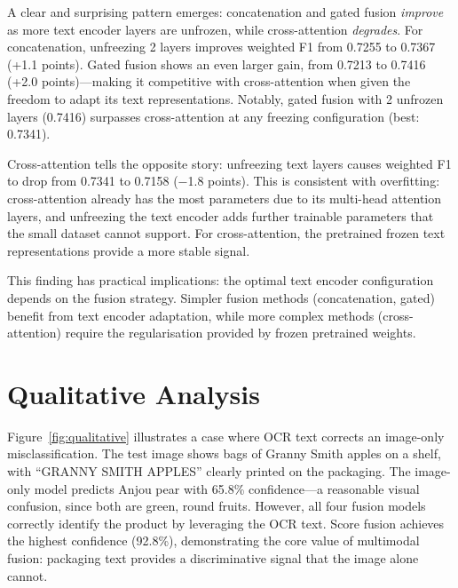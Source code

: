 \documentclass[10pt,twocolumn]{article}
\begin{document}
A clear and surprising pattern emerges: concatenation and gated fusion \emph{improve} as more text encoder layers are unfrozen, while cross-attention \emph{degrades}. For concatenation, unfreezing 2 layers improves weighted F1 from 0.7255 to 0.7367 (+1.1 points). Gated fusion shows an even larger gain, from 0.7213 to 0.7416 (+2.0 points)---making it competitive with cross-attention when given the freedom to adapt its text representations. Notably, gated fusion with 2 unfrozen layers (0.7416) surpasses cross-attention at any freezing configuration (best: 0.7341).

Cross-attention tells the opposite story: unfreezing text layers causes weighted F1 to drop from 0.7341 to 0.7158 ($-$1.8 points). This is consistent with overfitting: cross-attention already has the most parameters due to its multi-head attention layers, and unfreezing the text encoder adds further trainable parameters that the small dataset cannot support. For cross-attention, the pretrained frozen text representations provide a more stable signal.

This finding has practical implications: the optimal text encoder configuration depends on the fusion strategy. Simpler fusion methods (concatenation, gated) benefit from text encoder adaptation, while more complex methods (cross-attention) require the regularisation provided by frozen pretrained weights.

\section{Qualitative Analysis}

Figure~\ref{fig:qualitative} illustrates a case where OCR text corrects an image-only misclassification. The test image shows bags of Granny Smith apples on a shelf, with ``GRANNY SMITH APPLES'' clearly printed on the packaging. The image-only model predicts Anjou pear with 65.8\% confidence---a reasonable visual confusion, since both are green, round fruits. However, all four fusion models correctly identify the product by leveraging the OCR text. Score fusion achieves the highest confidence (92.8\%), demonstrating the core value of multimodal fusion: packaging text provides a discriminative signal that the image alone cannot.
\end{document}
